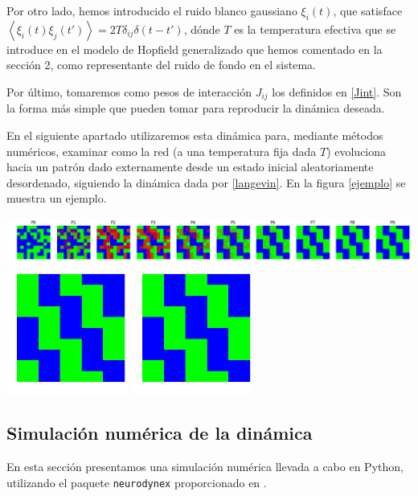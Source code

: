 \documentclass[titlepage,12pt]{article}
\numberwithin{equation}{section}
\begin{document}
	Por otro lado, hemos introducido el ruido blanco gaussiano $\xi_i(t)$, que satisface $\left<\xi_i(t)\xi_j(t')\right>=2T\delta_{ij}\delta(t-t')$, dónde $T$ es la temperatura efectiva que se introduce en el modelo de Hopfield generalizado que hemos comentado en la sección 2, como representante del ruido de fondo en el sistema.
	
	Por último, tomaremos como pesos de interacción $J_{ij}$ los definidos en \eqref{Jint}. Son la forma más simple que pueden tomar para reproducir la dinámica deseada. 
	
	En el siguiente apartado utilizaremos esta dinámica para, mediante métodos numéricos, examinar como la red (a una temperatura fija dada $T$) evoluciona hacia un patrón dado externamente desde un estado inicial aleatoriamente desordenado, siguiendo la dinámica dada por \eqref{langevin}. En la figura \ref{ejemplo} se muestra un ejemplo.
	\begin{center}
		\includegraphics[width=16cm]{pasos.png}
		\includegraphics[width=4cm]{final.png} \includegraphics[width=4cm]{patron.png}
		 \label{ejemplo}
	\end{center}
	\subsection{Simulación numérica de la dinámica}
	En esta sección presentamos una simulación numérica llevada a cabo en Python, utilizando el paquete \verb|neurodynex| proporcionado en \cite{neurodyn-ex}.
	
\end{document}
